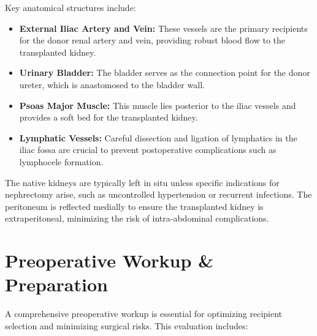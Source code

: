 Key anatomical structures include:

\begin{itemize}
  \item \textbf{External Iliac Artery and Vein:} These vessels are the primary recipients for the donor renal artery and vein, providing robust blood flow to the transplanted kidney.
  \item \textbf{Urinary Bladder:} The bladder serves as the connection point for the donor ureter, which is anastomosed to the bladder wall.
  \item \textbf{Psoas Major Muscle:} This muscle lies posterior to the iliac vessels and provides a soft bed for the transplanted kidney.
  \item \textbf{Lymphatic Vessels:} Careful dissection and ligation of lymphatics in the iliac fossa are crucial to prevent postoperative complications such as lymphocele formation.
\end{itemize}

The native kidneys are typically left in situ unless specific indications for nephrectomy arise, such as uncontrolled hypertension or recurrent infections. The peritoneum is reflected medially to ensure the transplanted kidney is extraperitoneal, minimizing the risk of intra-abdominal complications.

\section*{Preoperative Workup \& Preparation}
A comprehensive preoperative workup is essential for optimizing recipient selection and minimizing surgical risks. This evaluation includes:

